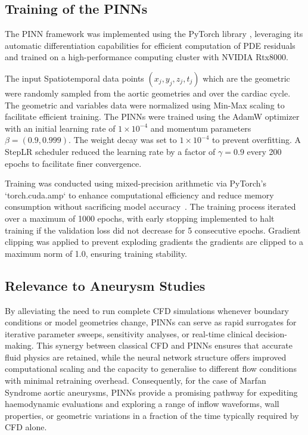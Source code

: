 \documentclass[12pt, a4paper]{article}
\begin{document}
\subsection{Training of the PINNs}

The PINN framework was implemented using the PyTorch library \citep{paszke2019pytorch}, leveraging its automatic differentiation capabilities for efficient computation of PDE residuals and trained on a high-performance computing cluster with NVIDIA Rtx8000. 

The input Spatiotemporal data points $(x_j, y_j, z_j, t_j)$ which are the geometric were randomly sampled from the aortic geometries and over the cardiac cycle. The geometric and variables data  were normalized using Min-Max scaling to facilitate efficient training. The PINNs were trained using the AdamW optimizer \citep{loshchilov2017decoupled} with an initial learning rate of $1 \times 10^{-4}$ and momentum parameters $\beta = (0.9, 0.999)$. The weight decay was set to $1 \times 10^{-4}$ to prevent overfitting. A StepLR scheduler reduced the learning rate by a factor of $\gamma = 0.9$ every 200 epochs to facilitate finer convergence.

Training was conducted using mixed-precision arithmetic via PyTorch's `torch.cuda.amp` to enhance computational efficiency and reduce memory consumption without sacrificing model accuracy~\cite{micikevicius2017mixed}. The training process iterated over a maximum of 1000 epochs, with early stopping implemented to halt training if the validation loss did not decrease for 5 consecutive epochs. Gradient clipping was applied to prevent exploding gradients the gradients are clipped to a maximum norm of 1.0, ensuring training stability.

\subsection{Relevance to Aneurysm Studies}
By alleviating the need to run complete CFD simulations whenever boundary conditions or model geometries change, PINNs can serve as rapid surrogates for iterative parameter sweeps, sensitivity analyses, or real-time clinical decision-making. This synergy between classical CFD and PINNs ensures that accurate fluid physics are retained, while the neural network structure offers improved computational scaling and the capacity to generalise to different flow conditions with minimal retraining overhead. Consequently, for the case of Marfan Syndrome aortic aneurysms, PINNs provide a promising pathway for expediting haemodynamic evaluations and exploring a range of inflow waveforms, wall properties, or geometric variations in a fraction of the time typically required by CFD alone.
\end{document}
